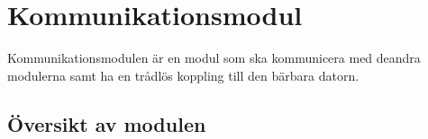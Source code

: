 \documentclass[systemskiss/skiss.tex]{subfiles}
\begin{document}
\section{Kommunikationsmodul}
Kommunikationsmodulen är en modul som ska kommunicera med deandra modulerna samt ha en trådlös koppling till den bärbara datorn. 
\subsection{Översikt av modulen}
\end{document}
